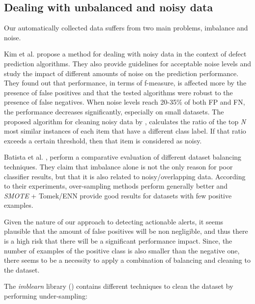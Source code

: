 \subsection{Dealing with unbalanced and noisy data}

Our automatically collected data suffers from two main problems, imbalance and noise. 

Kim et al. \cite{noise_defect} propose a method for dealing with noisy data in the context of defect prediction algorithms. They also provide guidelines for acceptable noise levels and study the impact of different amounts of noise on the prediction performance.
They found out that performance, in terms of f-measure, is affected more by the presence of false positives and that the tested algorithms were robust to the presence of false negatives. When noise levels reach 20-35\% of both FP and FN, the performance decreases significantly, especially on small datasets.
The proposed algorithm for cleaning noisy data by \cite{noise_defect}, calculates the ratio of the top \textit{N} most similar instances of each item that have a different class label. If that ratio exceeds a certain threshold, then that item is considered as noisy.

Batista et al. \cite{balancing_comparison}, perform a comparative evaluation of different dataset balancing techniques. They claim that imbalance alone is not the only reason for poor classifier results, but that it is also related to noisy/overlapping data. According to their experiments, over-sampling methods perform generally better and \textit{SMOTE} + Tomek/ENN provide good results for datasets with few positive examples.

Given the nature of our approach to detecting actionable alerts, it seems plausible that the amount of false positives will be non negligible, and thus there is a high risk that there will be a significant performance impact. Since, the number of examples of the positive class is also smaller than the negative one, there seems to be a necessity to apply a combination of balancing and cleaning to the dataset.

The \textit{imblearn} library (\cite{imblearn}) contains different techniques to clean the dataset by performing under-sampling:

